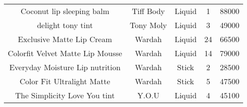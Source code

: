 \begin{table}[htbp]
\begin{tabular}{ccccc}
        Coconut lip sleeping balm               & Tiff Body         & Liquid                       & 1               & 88000          \\
        delight tony tint                       & Tony Moly         & Liquid                       & 3               & 49000          \\
        Exclusive Matte Lip Cream               & Wardah            & Liquid                       & 24              & 66500          \\
        Colorfit Velvet Matte Lip Mousse        & Wardah            & Liquid                       & 14              & 79000          \\
        Everyday Moisture Lip nutrition         & Wardah            & Stick                        & 2               & 28500          \\
        Color Fit Ultralight Matte              & Wardah            & Stick                        & 5               & 47500          \\
        The Simplicity Love You tint            & Y.O.U             & Liquid                       & 4               & 45100          \\
    \end{tabular}
\end{table}
\restoregeometry